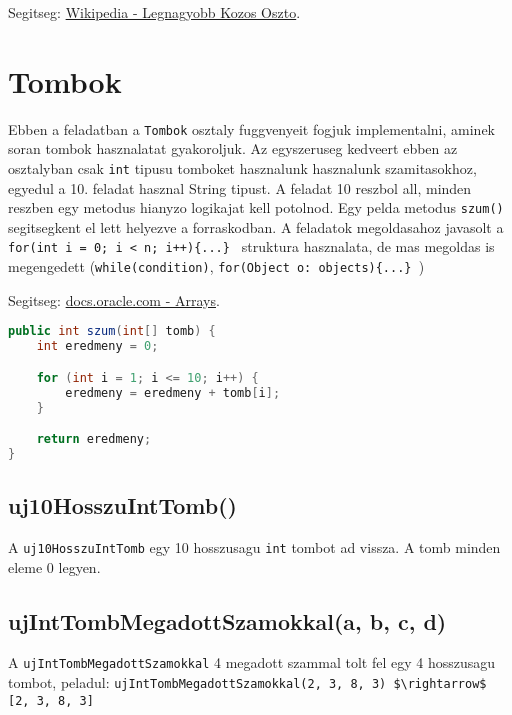 \documentclass{article}
\begin{document}
Segitseg: \href{https://hu.wikipedia.org/wiki/Legnagyobb_k\%C3\%B6z\%C3\%B6s_oszt\%C3\%B3}{Wikipedia - Legnagyobb Kozos Oszto}.

\newpage

\section{Tombok}

Ebben a feladatban a \lstinline{Tombok} osztaly fuggvenyeit fogjuk implementalni, aminek soran tombok hasznalatat gyakoroljuk. Az egyszeruseg kedveert ebben az osztalyban csak \lstinline{int} tipusu tomboket hasznalunk hasznalunk szamitasokhoz, egyedul a 10. feladat hasznal String tipust. A feladat 10 reszbol all, minden reszben egy metodus hianyzo logikajat kell potolnod. Egy pelda metodus \lstinline{szum()} segitsegkent el lett helyezve a forraskodban. A feladatok megoldasahoz javasolt a \lstinline|for(int i = 0; i < n; i++){...} | struktura hasznalata, de mas megoldas is megengedett (\lstinline{while(condition)}, \newline \lstinline|for(Object o: objects){...} |)

Segitseg: \href{https://docs.oracle.com/javase/tutorial/java/nutsandbolts/arrays.html}{docs.oracle.com - Arrays}.

\begin{lstlisting}[language=Java, caption=Pelda Metodus]
public int szum(int[] tomb) {
    int eredmeny = 0;

    for (int i = 1; i <= 10; i++) {
        eredmeny = eredmeny + tomb[i];
    }

    return eredmeny;
}
\end{lstlisting}

\subsection{uj10HosszuIntTomb()}
A \lstinline{uj10HosszuIntTomb} egy 10 hosszusagu \lstinline{int} tombot ad vissza. A tomb minden eleme 0 legyen.\newline

\subsection{ujIntTombMegadottSzamokkal(a, b, c, d)}
A \lstinline{ujIntTombMegadottSzamokkal} 4 megadott szammal tolt fel egy 4 hosszusagu tombot, peladul:\newline
\lstinline[mathescape]{ujIntTombMegadottSzamokkal(2, 3, 8, 3) $\rightarrow$ [2, 3, 8, 3]}\newline
\end{document}
